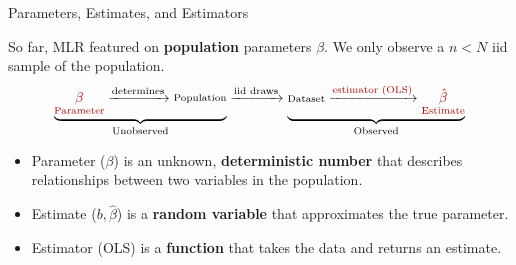 \documentclass[9pt,aspectratio=169]{beamer}
\begin{document}
\begin{frame}{Parameters, Estimates, and Estimators}

So far, MLR featured on \textbf{population} parameters $\beta$.
We only observe a $n<N$ iid sample of the population.
\pause
\[
\underbrace{
\underset{\text{\textcolor{red!70!black}{Parameter}}}{\textcolor{red!70!black}{\beta}} 
  \xrightarrow{\text{determines}} \substack{\text{Population}}}_{\text{Unobserved}}
  \xrightarrow{\text{iid draws}} 
  \underbrace{\substack{\text{Dataset}}
  \xrightarrow{\text{\textcolor{red!70!black}{estimator (OLS)}}} 
  \underset{\text{\textcolor{red!70!black}{Estimate}}}{\textcolor{red!70!black}{\hat{\beta}}}}_{\text{Observed}}
\]
\pause
\begin{itemize}
    \item \textcolor{red!70!black}{Parameter ($\beta$)} is an unknown, \textbf{deterministic number} that describes relationships between two variables in the population.
    \item \textcolor{red!70!black}{Estimate ($b, \hat{\beta}$)} is a \textbf{random variable} that approximates the true parameter.
    \item \textcolor{red!70!black}{Estimator (OLS)} is a \textbf{function} that takes the data and returns an estimate.
\end{itemize}
\end{frame}
\end{document}
